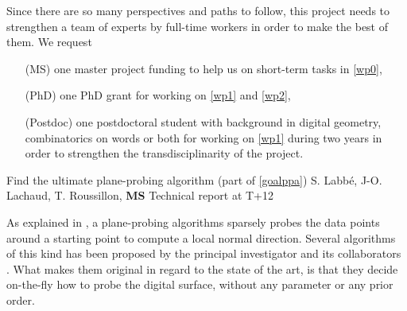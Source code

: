 Since there are so many perspectives and paths to follow, this project needs
to strengthen a team of experts by full-time workers in order to make the best of them.
We request
\begin{itemize}
\item[(MS)] one master project funding to help us on short-term tasks in \ref{wp0},
\item[(PhD)] one PhD grant for working on \ref{wp1} and \ref{wp2},
\item[(Postdoc)] one postdoctoral student with background in digital geometry,
  combinatorics on words or both for working on \ref{wp1} during two years
  in order to strengthen the transdisciplinarity of the project. 
\end{itemize}




   {Find the ultimate plane-probing algorithm (part of \ref{goalppa})}
   {S. Labb\'{e}, J-O. Lachaud, T. Roussillon, \textbf{MS}}
   {Technical report at T+12}
\medskip

As explained in , a plane-probing algorithms sparsely probes the data points
around a starting point to compute a local normal direction. Several algorithms of this kind
has been proposed by the principal investigator and its collaborators
\cite{LPRTCS2016, LPRDGCI2016, LPRJMIV2017}.
What makes them original in regard to the state of the art, is that they decide on-the-fly
how to probe the digital surface, without any parameter or any prior order.


